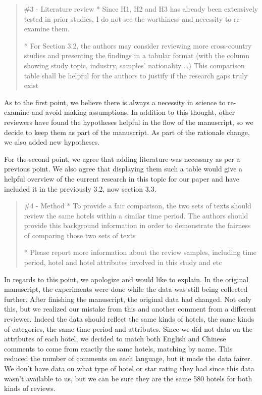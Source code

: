 \documentclass{letter}
\begin{document}
\begin{quotation}
\#3 - Literature review
*  Since H1, H2 and H3 has already been extensively tested in prior studies, I do not see the worthiness and necessity to re-examine them. 

*  For Section 3.2, the authors may consider reviewing more cross-country studies and presenting the findings in a tabular format (with the column showing study topic, industry, samples' nationality …) This comparison table shall be helpful for the authors to justify if the research gaps truly exist
\end{quotation}


As to the first point, we believe there is always a necessity in science to re-examine and avoid making assumptions. In addition to this thought, other reviewers have found the hypotheses helpful in the flow of the manuscript, so we decide to keep them as part of the manuscript. As part of the rationale change, we also added new hypotheses.

For the second point, we agree that adding literature was necessary as per a previous point. We also agree that displaying them such a table would give a helpful overview of the current research in this topic for our paper and have included it in the previously 3.2, now section 3.3.



\begin{quotation}
\#4 - Method
*  To provide a fair comparison, the two sets of texts should review the same hotels within a similar time period. The authors should provide this background information in order to demonstrate the fairness of comparing those two sets of texts

*  Please report more information about the review samples, including time period, hotel and hotel attributes involved in this study and etc
\end{quotation}


In regards to this point, we apologize and would like to explain. In the original manuscript, the experiments were done while the data was still being collected further. After finishing the manuscript, the original data had changed. Not only this, but we realized our mistake from this and another comment from a different reviewer. Indeed the data should reflect the same kinds of hotels, the same kinds of categories, the same time period and attributes. Since we did not data on the attributes of each hotel, we decided to match both English and Chinese comments to come from exactly the same hotels, matching by name. This reduced the number of comments on each language, but it made the data fairer. We don't have data on what type of hotel or star rating they had since this data wasn't available to us, but we can be sure they are the same 580 hotels for both kinds of reviews. 
\end{document}
